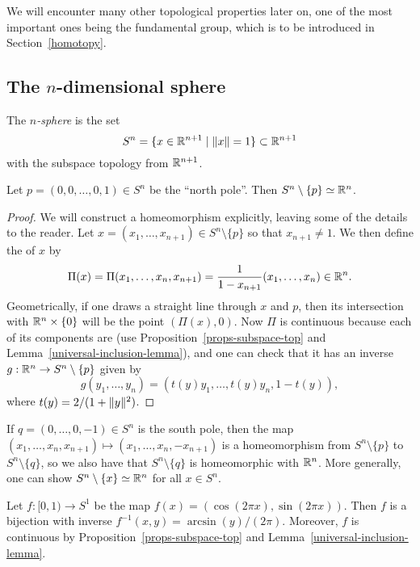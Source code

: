 We will encounter many other topological properties later on, one of the most important ones being the fundamental group, which is to be introduced in Section~\ref{homotopy}.

\subsection{The $n$-dimensional sphere}
\begin{defn}
  The \emph{$n$-sphere} is the set
  \[
    S^n = \{ x \in \mathbb{R}^{n+1} \mid \lVert x \rVert = 1 \} \subset \mathbb{R}^{n+1}
  \]
  with the subspace topology from $\mathbb{R}^{n+1}$.
\end{defn}
\begin{prop}
  Let $p = (0,0,\dots,0,1) \in S^n$ be the ``north pole''. Then $S^n \setminus \{p\} \simeq \mathbb{R}^n$.
\end{prop}
\begin{proof}
  We will construct a homeomorphism explicitly, leaving some of the details to the reader. Let $x = (x_1, \dots, x_{n+1}) \in S^n \setminus \{ p \}$ so that $x_{n+1} \not= 1$. We then define the  of $x$ by
  \[
    \Pi(x) = \Pi(x_1,\dots,x_n,x_{n+1}) = \frac{1}{1-x_{n+1}} (x_1, \dots, x_n) \in \mathbb{R}^n.
  \]
  Geometrically, if one draws a straight line through $x$ and $p$, then its intersection with $\mathbb{R}^n \times \{0 \}$ will be the point $(\Pi(x),0)$. Now $\Pi$ is continuous because each of its components are (use Proposition~\ref{props-subspace-top} and Lemma~\ref{universal-inclusion-lemma}), and one can check that it has an inverse $g : \mathbb{R}^n \to S^n \setminus \{p \}$ given by
  \[
    g(y_1, \dots, y_n) = (t(y) y_1, \dots, t(y)y_n, 1-t(y)),
  \]
  where $t(y) = 2/(1+\lVert y \rVert^2)$.
\end{proof}
\begin{rem}
  If $q = (0,\dots,0,-1) \in S^n$ is the south pole, then the map $(x_1, \dots, x_n,x_{n+1}) \mapsto (x_1,\dots,x_n,-x_{n+1})$ is a homeomorphism from $S^n \setminus \{p\}$ to $S^n \setminus \{ q \}$, so we also have that $S^n \setminus \{ q \}$ is homeomorphic with $\mathbb{R}^n$. More generally, one can show $S^n \setminus \{x\} \simeq \mathbb{R}^n$ for all $x \in S^n$.
\end{rem}
\begin{example}
  Let $f : [0,1) \to S^1$ be the map $f(x) = (\cos (2\pi x), \sin(2\pi x))$. Then $f$ is a bijection with inverse $f^{-1}(x,y) = \arcsin(y)/(2\pi)$. Moreover, $f$ is continuous by Proposition~\ref{props-subspace-top} and Lemma~\ref{universal-inclusion-lemma}.
\end{example}
